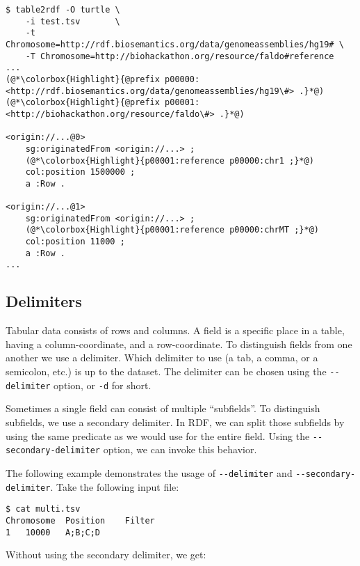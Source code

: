 \begin{siderules}
\begin{lstlisting}
$ table2rdf -O turtle \
    -i test.tsv       \
    -t Chromosome=http://rdf.biosemantics.org/data/genomeassemblies/hg19# \
    -T Chromosome=http://biohackathon.org/resource/faldo#reference
...
(@*\colorbox{Highlight}{@prefix p00000: <http://rdf.biosemantics.org/data/genomeassemblies/hg19\#> .}*@)
(@*\colorbox{Highlight}{@prefix p00001: <http://biohackathon.org/resource/faldo\#> .}*@)

<origin://...@0>
    sg:originatedFrom <origin://...> ;
    (@*\colorbox{Highlight}{p00001:reference p00000:chr1 ;}*@)
    col:position 1500000 ;
    a :Row .

<origin://...@1>
    sg:originatedFrom <origin://...> ;
    (@*\colorbox{Highlight}{p00001:reference p00000:chrMT ;}*@)
    col:position 11000 ;
    a :Row .
...
\end{lstlisting}
\end{siderules}

\subsection{Delimiters}

  Tabular data consists of rows and columns.  A field is a specific place in
  a table, having a column-coordinate, and a row-coordinate.  To distinguish
  fields from one another we use a delimiter.  Which delimiter to use (a tab,
  a comma, or a semicolon, etc.) is up to the dataset.  The delimiter
  can be chosen using the \texttt{-{}-delimiter} option, or \texttt{-d} for
  short.

  Sometimes a single field can consist of multiple ``subfields''.  To
  distinguish subfields, we use a secondary delimiter.  In RDF, we can split
  those subfields by using the same predicate as we would use for the entire
  field.  Using the \texttt{-{}-secondary-delimiter} option, we can invoke
  this behavior.

  The following example demonstrates the usage of \texttt{-{}-delimiter} and
  \texttt{-{}-secondary-delimiter}.  Take the following input file:
\begin{siderules}
\begin{verbatim}
$ cat multi.tsv
Chromosome	Position	Filter
1	10000	A;B;C;D
\end{verbatim}
\end{siderules}

  Without using the secondary delimiter, we get:

